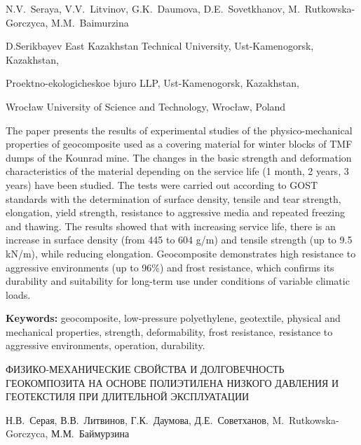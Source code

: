
\begin{header}

N.V.~Seraya,
V.V.~Litvinov,
G.K.~Daumova\envelope,
D.E.~Sovetkhanov,
M.~Rutkowska-Gorczyca,
M.M.~Baimurzina
\end{header}

\begin{affil}
D.Serikbayev East Kazakhstan Technical University, Ust-Kamenogorsk, Kazakhstan,

Proektno-ekologicheskoe bjuro LLP, Ust-Kamenogorsk, Kazakhstan,

Wrocław University of Science and Technology, Wrocław, Poland

\end{affil}

The paper presents the results of experimental studies of the
physico-mechanical properties of geocom\-posite used as a covering
material for winter blocks of TMF dumps of the Kounrad mine. The changes
in the basic strength and deformation characteristics of the material
depending on the service life (1 month, 2 years, 3 years) have been
studied. The tests were carried out according to GOST standards with the
determination of surface density, tensile and tear strength, elongation,
yield strength, resistance to aggressive media and repeated freezing and
thawing. The results showed that with increasing service life, there is
an increase in surface density (from 445 to 604 g/m)
and tensile strength (up to 9.5 kN/m), while reducing elongation.
Geocomposite demonstrates high resistance to aggressive environments (up
to 96\%) and frost resistance, which confirms its durability and
suitability for long-term use under conditions of variable climatic
loads.

{\bfseries Keywords:} geocomposite, low-pressure polyethylene, geotextile,
physical and mechanical properties, strength, deformability, frost
resistance, resistance to aggressive environments, operation,
durability.

\begin{header}
ФИЗИКО-МЕХАНИЧЕСКИЕ СВОЙСТВА И ДОЛГОВЕЧНОСТЬ ГЕОКОМПОЗИТА НА ОСНОВЕ ПОЛИЭТИЛЕНА НИЗКОГО ДАВЛЕНИЯ И ГЕОТЕКСТИЛЯ ПРИ ДЛИТЕЛЬНОЙ ЭКСПЛУАТАЦИИ

Н.В.~Серая,
В.В.~Литвинов,
Г.К.~Даумова\envelope,
Д.Е.~Советханов,
M.~Rutkowska-Gorczyca,
М.М.~Баймурзина
\end{header}

